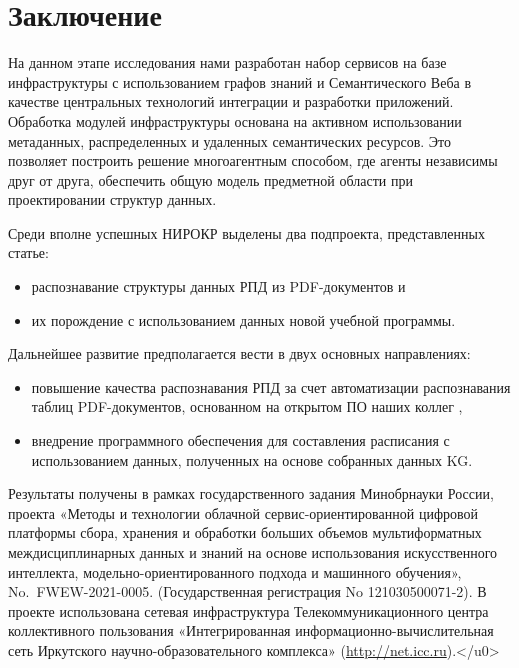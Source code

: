 \documentclass[
]{aiitart}
\begin{document}
\section*{Заключение}

На данном этапе исследования нами разработан набор сервисов на базе инфраструктуры с использованием графов знаний и Семантического Веба в качестве центральных технологий интеграции и разработки приложений. Обработка модулей инфраструктуры основана на активном использовании метаданных, распределенных и удаленных семантических ресурсов. Это позволяет построить решение многоагентным способом, где агенты независимы друг от друга, обеспечить общую модель предметной области при проектировании структур данных.

Среди вполне успешных НИРОКР выделены два подпроекта, представленных статье:
\begin{itemize}
\item распознавание структуры данных РПД из PDF-документов и
\item их порождение с использованием данных новой учебной программы.
\end{itemize}
Дальнейшее развитие предполагается вести в двух основных направлениях:
\begin{itemize}
\item повышение качества распознавания РПД за счет автоматизации распознавания таблиц PDF-документов, основанном на открытом ПО наших коллег \cite{Shigarov_2016,Shigarov_2017},
\item внедрение программного обеспечения для составления расписания с использованием данных, полученных на основе собранных данных KG.
\end{itemize}


\begin{acknowledgments}
Результаты получены в рамках государственного задания Минобрнауки России, проекта «Методы и технологии облачной сервис-ориентированной цифровой платформы сбора, хранения и обработки больших объемов мультиформатных междисциплинарных данных и знаний на основе использования искусственного интеллекта, модельно-ориентированного подхода и машинного обучения», No.~FWEW-2021-0005. (Государственная регистрация No 121030500071-2).  В проекте использована сетевая инфраструктура Телекоммуникационного центра коллективного пользования «Интегрированная информационно-вычислительная сеть Иркутского научно-образовательного комплекса» (\url{http://net.icc.ru}).</u0>
\end{acknowledgments}
\end{document}
